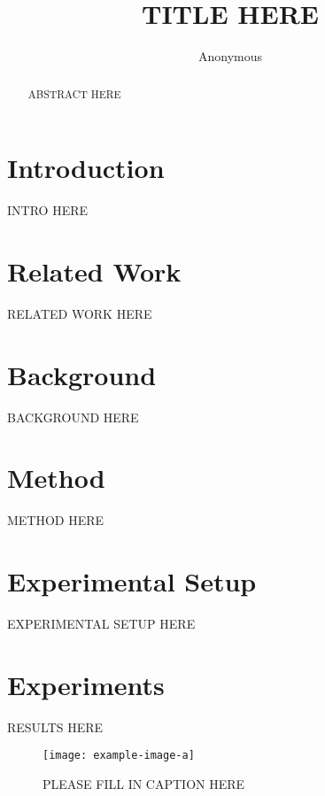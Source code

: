 \documentclass{article} %
\title{
TITLE HERE
}
\author{Anonymous}
\theoremstyle{plain}
\theoremstyle{definition}
\theoremstyle{remark}
\begin{document}
\maketitle

\begin{abstract}
ABSTRACT HERE
\end{abstract}

\section{Introduction}
\label{sec:intro}
INTRO HERE

\section{Related Work}
\label{sec:related}
RELATED WORK HERE

\section{Background}
\label{sec:background}
BACKGROUND HERE

\section{Method}
\label{sec:method}
METHOD HERE

\section{Experimental Setup}
\label{sec:experimental_setup}
EXPERIMENTAL SETUP HERE

\section{Experiments}
\label{sec:experiments}
RESULTS HERE

\begin{figure}[h!]
\centering
\texttt{[image: example-image-a]}
\caption{PLEASE FILL IN CAPTION HERE}
\label{fig:first_figure}
\end{figure}
\end{document}
